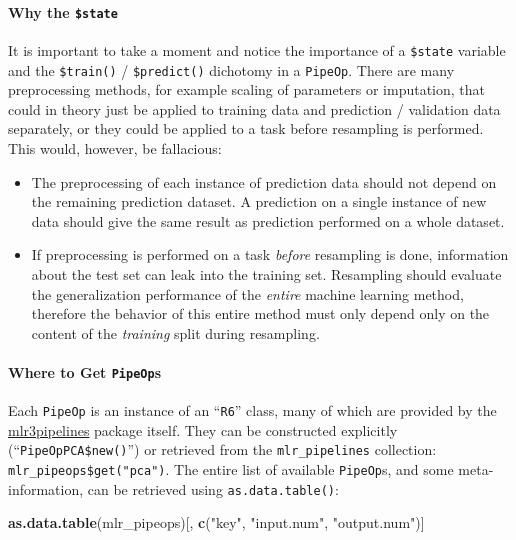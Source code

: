 \documentclass[]{article}
\newenvironment{Shaded}{\begin{snugshade}}{\end{snugshade}}
\newcommand{\KeywordTok}[1]{\textcolor[rgb]{0.13,0.29,0.53}{\textbf{#1}}}
\newcommand{\NormalTok}[1]{#1}
\newcommand{\StringTok}[1]{\textcolor[rgb]{0.31,0.60,0.02}{#1}}
\providecommand{\tightlist}{%
  \setlength{\itemsep}{0pt}\setlength{\parskip}{0pt}}
\let\oldparagraph\paragraph
\renewcommand{\paragraph}[1]{\oldparagraph{#1}\mbox{}}
\renewenvironment{Shaded} {\begin{snugshade}\small} {\end{snugshade}}
\begin{document}
\hypertarget{why-the-state}{%
\paragraph{\texorpdfstring{Why the \texttt{\$state}}{Why the \$state}}\label{why-the-state}}

It is important to take a moment and notice the importance of a \texttt{\$state} variable and the \texttt{\$train()} / \texttt{\$predict()} dichotomy in a \texttt{PipeOp}.
There are many preprocessing methods, for example scaling of parameters or imputation, that could in theory just be applied to training data and prediction / validation data separately, or they could be applied to a task before resampling is performed.
This would, however, be fallacious:

\begin{itemize}
\tightlist
\item
  The preprocessing of each instance of prediction data should not depend on the remaining prediction dataset.
  A prediction on a single instance of new data should give the same result as prediction performed on a whole dataset.
\item
  If preprocessing is performed on a task \emph{before} resampling is done, information about the test set can leak into the training set.
  Resampling should evaluate the generalization performance of the \emph{entire} machine learning method, therefore the behavior of this entire method must only depend only on the content of the \emph{training} split during resampling.
\end{itemize}

\hypertarget{where-to-get-pipeops}{%
\paragraph{\texorpdfstring{Where to Get \texttt{PipeOp}s}{Where to Get PipeOps}}\label{where-to-get-pipeops}}

Each \texttt{PipeOp} is an instance of an ``\texttt{R6}'' class, many of which are provided by the \href{https://cran.r-project.org/package=mlr3pipelines}{mlr3pipelines} package itself.
They can be constructed explicitly (``\texttt{PipeOpPCA\$new()}'') or retrieved from the \texttt{mlr\_pipelines} collection: \texttt{mlr\_pipeops\$get("pca")}.
The entire list of available \texttt{PipeOp}s, and some meta-information, can be retrieved using \texttt{as.data.table()}:

\begin{Shaded}
\begin{Highlighting}[]
\KeywordTok{as.data.table}\NormalTok{(mlr_pipeops)[, }\KeywordTok{c}\NormalTok{(}\StringTok{"key"}\NormalTok{, }\StringTok{"input.num"}\NormalTok{, }\StringTok{"output.num"}\NormalTok{)]}
\end{Highlighting}
\end{Shaded}
\end{document}
